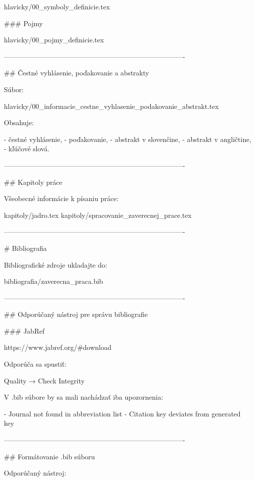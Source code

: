 hlavicky/00_symboly_definicie.tex

### Pojmy

hlavicky/00_pojmy_definicie.tex

-------------------------------------------------------------------------------

## Čestné vyhlásenie, poďakovanie a abstrakty

Súbor:

hlavicky/00_informacie_cestne_vyhlasenie_podakovanie_abstrakt.tex

Obsahuje:

- čestné vyhlásenie,
- poďakovanie,
- abstrakt v slovenčine,
- abstrakt v angličtine,
- kľúčové slová.

-------------------------------------------------------------------------------

## Kapitoly práce

Všeobecné informácie k písaniu práce:

kapitoly/jadro.tex  
kapitoly/spracovanie_zaverecnej_prace.tex

-------------------------------------------------------------------------------

# Bibliografia

Bibliografické zdroje ukladajte do:

bibliografia/zaverecna_praca.bib

-------------------------------------------------------------------------------

## Odporúčaný nástroj pre správu bibliografie

### JabRef

https://www.jabref.org/#download

Odporúča sa spustiť:

Quality → Check Integrity

V .bib súbore by sa mali nachádzať iba upozornenia:

- Journal not found in abbreviation list
- Citation key deviates from generated key

-------------------------------------------------------------------------------

## Formátovanie .bib súboru

Odporúčaný nástroj:

